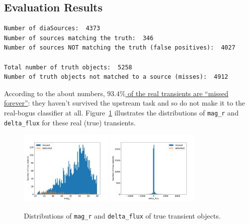 \documentclass[DM,authoryear,toc]{lsstdoc}
\begin{document}
\subsection{Evaluation Results}
\begin{verbatim}
Number of diaSources:  4373
Number of sources matching the truth:  346
Number of sources NOT matching the truth (false positives):  4027

Total number of truth objects:  5258
Number of truth objects not matched to a source (misses):  4912
\end{verbatim}

According to the about numbers, \underline{$93.4\%$ of the real transients are ``missed forever''}: they haven't survived the upstream task and so do not make it to the real-bogus classifier at all.
Figure~\ref{fig:distributions} illustrates the distributions of \texttt{mag\_r} and \texttt{delta\_flux} for these real (true) transients.

\begin{figure}[h]
  \centering
  \includegraphics[width=0.4\textwidth]{mag_r_hist.png}
  \includegraphics[width=0.4\textwidth]{delta_flux_hist.png}
  \caption{Distributions of \texttt{mag\_r} and \texttt{delta\_flux} of true transient objects.}
  \label{fig:distributions}
\end{figure}

\clearpage
\end{document}
